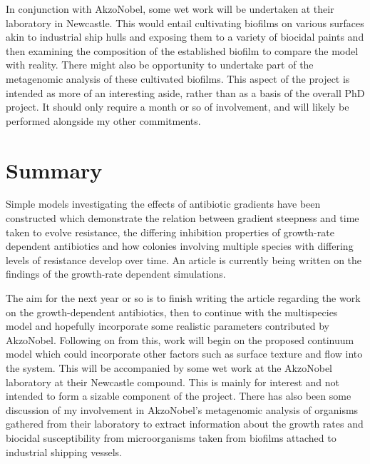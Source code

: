 \documentclass[a4paper,12pt]{article}
\begin{document}
In conjunction with AkzoNobel, some wet work will be undertaken at their laboratory in Newcastle.  This would entail cultivating biofilms on various surfaces akin to industrial 
ship hulls and exposing them to a variety of biocidal paints and then examining the composition of the established biofilm to compare the model with reality.  There might also 
be opportunity to undertake part of the metagenomic analysis of these cultivated biofilms.  This aspect of the project is intended as more of an interesting aside, rather than 
as a basis of the overall PhD project.  It should only require a month or so of involvement, and will likely be performed alongside my other commitments. 

% 
% 
 
\section{Summary}

Simple models investigating the effects of antibiotic gradients have been constructed which demonstrate the relation between gradient steepness and time taken to evolve resistance, 
the differing inhibition properties of growth-rate dependent antibiotics and how colonies involving multiple species with differing levels of resistance develop over time.  An 
article is currently being written on the findings of the growth-rate dependent simulations.

The aim for the next year or so is to finish writing the article regarding the work on the growth-dependent antibiotics, then to continue with the multispecies
model and hopefully incorporate some realistic parameters contributed by AkzoNobel.  Following on from this, work will begin on the proposed
continuum model which could incorporate other factors such as surface texture and flow into the system.  This will be accompanied by some wet work at the AkzoNobel laboratory
at their Newcastle compound.  This is mainly for interest and not intended to form a sizable component of the project.  There has also been some discussion of
my involvement in AkzoNobel's metagenomic analysis of organisms gathered from their laboratory to extract information about the growth rates and biocidal susceptibility from 
microorganisms taken from biofilms attached to industrial shipping vessels.


\pagebreak
\newpage


\end{document}
